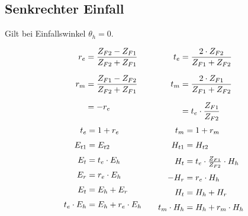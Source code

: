 \subsection[Senkrechter Einfall]{Senkrechter Einfall}
Gilt bei Einfallswinkel $ \theta_h = 0 $.

\begin{equation*}
\setlength{\jot}{10pt}
\begin{aligned}[t]
%
	r_e &= \frac{Z_{F2}-Z_{F1}}{Z_{F2} + Z_{F1}}\\
	r_m &= \frac{Z_{F1}-Z_{F2}}{Z_{F2} + Z_{F1}}\\
	&=-r_e\\
\end{aligned}
\qquad \qquad
\begin{aligned}[t]
	t_e  &= \frac{2 \cdot Z_{F2}}{Z_{F1} + Z_{F2}}\\ 
	t_m  &= \frac{2 \cdot Z_{F1}}{Z_{F1} + Z_{F2}} \\
	&= t_e \cdot \frac{Z_{F1}}{Z_{F2}}\\
\end{aligned}
\end{equation*}
\vspace{-0.2cm}
\begin{equation*}
\setlength{\jot}{6pt}
\begin{aligned}[t]
	t_e & = 1+ r_e \\	
	E_{t1} & =E_{t2}\\
    E_t & = t_e \cdot E_h \\
	E_r & = r_e \cdot E_h \\
	E_t & = E_h + E_r \\        
	t_e\cdot E_{h} & = E_{h} + r_e\cdot  E_{h} \\
\end{aligned}
\qquad
\begin{aligned}[t]
	t_m & = 1+ r_m \\
	H_{t1} &= H_{t2}\\
	H_t & = t_e \cdot \tfrac{Z_{F1}}{Z_{F2}} \cdot H_h \\
	-H_r & = r_e \cdot H_h \\
	H_t & = H_h + H_r \\        
	t_m\cdot H_{h} & = H_{h} + r_m\cdot  H_{h} \\
\end{aligned}
\end{equation*}

